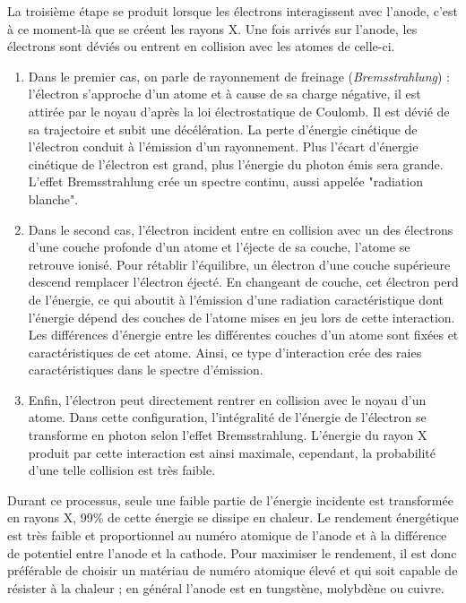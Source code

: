 La troisième étape se produit lorsque les électrons interagissent avec l'anode, c'est à ce moment-là que se créent les rayons X. Une fois arrivés sur l'anode, les électrons sont déviés ou entrent en collision avec les atomes de celle-ci. 
\begin{enumerate}
	\item Dans le premier cas, on parle de rayonnement de freinage ({\it Bremsstrahlung}) : l'électron s'approche d'un atome et à cause de sa charge négative, il est attirée par le noyau d'après la loi électrostatique de Coulomb. Il est dévié de sa trajectoire et subit une décélération. La perte d'énergie cinétique de l'électron conduit à l'émission d'un rayonnement. Plus l'écart d'énergie cinétique de l'électron est grand, plus l'énergie du photon émis sera grande. L'effet Bremsstrahlung crée un spectre continu, aussi appelée "radiation blanche". 

	\item Dans le second cas, l'électron incident entre en collision avec un des électrons d'une couche profonde d'un atome et l'éjecte de sa couche, l'atome se retrouve ionisé. Pour rétablir l'équilibre, un électron d'une couche supérieure descend remplacer l'électron éjecté. En changeant de couche, cet électron perd de l'énergie, ce qui aboutit à l'émission d'une radiation caractéristique dont l'énergie dépend des couches de l'atome mises en jeu lors de cette interaction. Les différences d'énergie entre les différentes couches d'un atome sont fixées et caractéristiques de cet atome. Ainsi, ce type d'interaction crée des raies caractéristiques dans le spectre d'émission. 
	
	\item Enfin, l'électron peut directement rentrer en collision avec le noyau d'un atome. Dans cette configuration, l'intégralité de l'énergie de l'électron se transforme en photon selon l'effet Bremsstrahlung. L'énergie du rayon X produit par cette interaction est ainsi maximale, cependant, la probabilité d'une telle collision est très faible.  
\end{enumerate}

Durant ce processus, seule une faible partie de l'énergie incidente est transformée en rayons X, 99\% de cette énergie se dissipe en chaleur. Le rendement énergétique est très faible et proportionnel au numéro atomique de l'anode et à la différence de potentiel entre l'anode et la cathode. Pour maximiser le rendement, il est donc préférable de choisir un matériau de numéro atomique élevé et qui soit capable de résister à la chaleur ; en général l'anode est en tungstène, molybdène ou cuivre.

